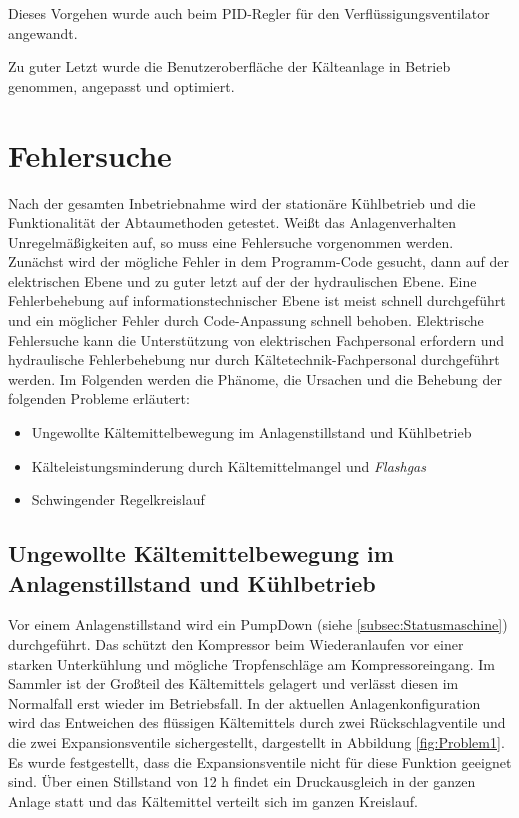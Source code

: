 Dieses Vorgehen wurde auch beim PID-Regler für den Verflüssigungsventilator angewandt.

Zu guter Letzt wurde die Benutzeroberfläche der Kälteanlage in Betrieb genommen, angepasst und optimiert. 

\section{Fehlersuche}
\label{sec:Fehlersuche}

Nach der gesamten Inbetriebnahme wird der stationäre Kühlbetrieb und  die Funktionalität der Abtaumethoden getestet. Weißt das Anlagenverhalten Unregelmäßigkeiten auf, so muss eine Fehlersuche vorgenommen werden. Zunächst wird der mögliche Fehler in dem Programm-Code gesucht, dann auf der elektrischen Ebene und zu guter letzt auf der der hydraulischen Ebene. Eine Fehlerbehebung auf informationstechnischer Ebene ist meist schnell durchgeführt und ein möglicher Fehler durch Code-Anpassung schnell behoben. Elektrische Fehlersuche kann die Unterstützung von elektrischen Fachpersonal erfordern und hydraulische Fehlerbehebung nur durch Kältetechnik-Fachpersonal durchgeführt werden. 
Im Folgenden werden die Phänome, die Ursachen und die Behebung der folgenden Probleme erläutert:

\begin{itemize}
\item	Ungewollte Kältemittelbewegung im Anlagenstillstand und Kühlbetrieb
\item	Kälteleistungsminderung durch Kältemittelmangel und \textit{Flashgas}
\item 	Schwingender Regelkreislauf
\end{itemize}

\subsection*{Ungewollte Kältemittelbewegung im Anlagenstillstand und Kühlbetrieb}

Vor einem Anlagenstillstand wird ein PumpDown (siehe \ref{subsec:Statusmaschine}) durchgeführt. Das schützt den Kompressor beim Wiederanlaufen vor einer starken Unterkühlung und mögliche Tropfenschläge am Kompressoreingang. Im Sammler ist der Großteil des Kältemittels gelagert und verlässt diesen im Normalfall erst wieder im Betriebsfall. In der aktuellen Anlagenkonfiguration wird das Entweichen des flüssigen Kältemittels durch zwei Rückschlagventile und die zwei Expansionsventile sichergestellt, dargestellt in Abbildung \ref{fig:Problem1}. Es wurde festgestellt, dass die Expansionsventile nicht für diese Funktion geeignet sind. Über einen Stillstand von 12 h findet ein Druckausgleich in der ganzen Anlage statt und das Kältemittel verteilt sich im ganzen Kreislauf.

